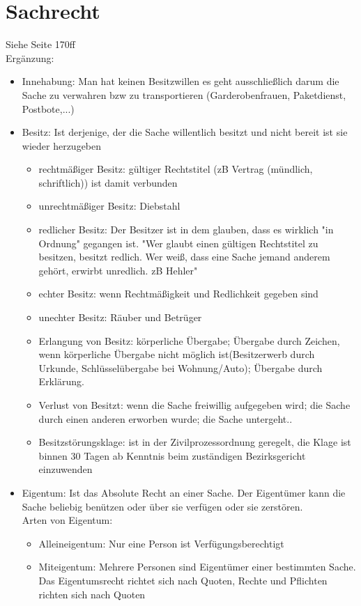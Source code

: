 \documentclass[a4paper]{report}
\begin{document}
\section{Sachrecht}
Siehe Seite 170ff\\
Ergänzung: 
\begin{itemize}
\item Innehabung: Man hat keinen Besitzwillen es geht ausschließlich darum die Sache zu verwahren bzw zu transportieren (Garderobenfrauen, Paketdienst, Postbote,...) 
\item Besitz: Ist derjenige, der die Sache willentlich besitzt und nicht bereit ist sie wieder herzugeben 
\begin{itemize}
\item rechtmäßiger Besitz: gültiger Rechtstitel (zB Vertrag (mündlich, schriftlich)) ist damit verbunden
\item unrechtmäßiger Besitz: Diebstahl
\item redlicher Besitz: Der Besitzer ist in dem glauben, dass es wirklich "in Ordnung" gegangen ist. "Wer glaubt einen gültigen Rechtstitel zu besitzen, besitzt redlich. Wer weiß, dass eine Sache jemand anderem gehört, erwirbt unredlich. zB Hehler"
\item echter Besitz: wenn Rechtmäßigkeit und Redlichkeit gegeben sind
\item unechter Besitz: Räuber und Betrüger
\item Erlangung von Besitz: körperliche Übergabe; Übergabe durch Zeichen, wenn körperliche Übergabe nicht möglich ist(Besitzerwerb durch Urkunde, Schlüsselübergabe bei Wohnung/Auto); Übergabe durch Erklärung.
\item Verlust von Besitzt: wenn die Sache freiwillig aufgegeben wird; die Sache durch einen anderen erworben wurde; die Sache untergeht..\\
\item Besitzstörungsklage: ist in der Zivilprozessordnung geregelt, die Klage ist binnen 30 Tagen ab Kenntnis beim zuständigen Bezirksgericht einzuwenden
\end{itemize}
\item Eigentum: Ist das Absolute Recht an einer Sache. Der Eigentümer kann die Sache beliebig benützen oder über sie verfügen oder sie zerstören.\\ 
Arten von Eigentum: 
\begin{itemize}
\item Alleineigentum: Nur eine Person ist Verfügungsberechtigt
\item Miteigentum: Mehrere Personen sind Eigentümer einer bestimmten Sache. Das Eigentumsrecht richtet sich nach Quoten, Rechte und Pflichten richten sich nach Quoten

\end{itemize}
\end{itemize}
\end{document}
